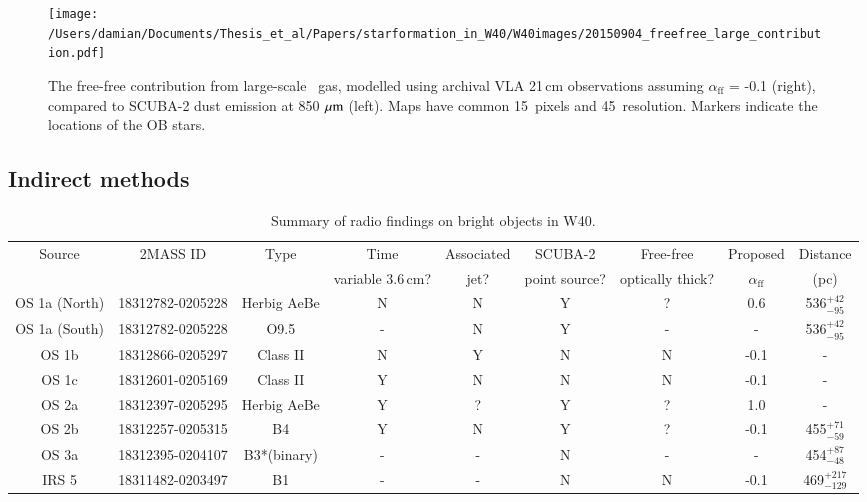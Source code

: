 \begin{figure}
\begin{centering}
\texttt{[image: /Users/damian/Documents/Thesis\_et\_al/Papers/starformation\_in\_W40/W40images/20150904\_freefree\_large\_contribution.pdf]}
\caption{The free-free contribution from large-scale \HII\ gas, modelled using archival VLA 21\,cm observations \citep{Condon:1998kx} assuming $\alpha_{\mathrm{ff}}$ = -0.1 (right), compared to SCUBA-2 dust emission at 850\,$\,\mu\rm{m}$ (left). Maps have common 15\arcsec\ pixels and 45\arcsec\ resolution. Markers indicate the locations of the OB stars.} 
\label{fig:freefree21}
\end{centering}
\end{figure} 



\subsection{Indirect methods}

\begin{table}
\caption{Summary of radio findings on bright objects in W40. }
\begin{center}
\begin{tabular}{|ccccccccc|}
\hline
Source	&	2MASS ID		&	Type		&	Time				&	Associated	&	SCUBA-2 		&	Free-free		&	Proposed				&	Distance  \\
		&				&			&	variable 3.6\,cm?	&	jet?			&	point source?	&	optically thick?	&	$\alpha_{\mathrm{ff}}$		&	(pc)		\\
\hline
\hline
OS 1a (North)	& 18312782-0205228	& 	Herbig AeBe	&	N	&	N	&	Y	&	?	&	0.6	&	536$^{+42}_{-95}$	\\
OS 1a (South)	& 18312782-0205228	&	O9.5			&	-	&	N	&	Y	&	-	&	-	&	536$^{+42}_{-95}$	\\
OS 1b		& 18312866-0205297	&	Class II		&	N	&	Y	&	N	&	N	&	-0.1	&	-				\\
OS 1c		& 18312601-0205169	&	Class II		&	Y	&	N	&	N	&	N	&	-0.1	&	-				\\
OS 2a		& 18312397-0205295	&	Herbig AeBe	&	Y	&	?	&	Y	&	?	&	1.0	&	-				\\
OS 2b		& 18312257-0205315	&	B4			&	Y	&	N	&	Y	&	?	&	-0.1	&	455$^{+71}_{-59}$	\\
OS 3a		& 18312395-0204107	&	B3*(binary)	&	-	&	-	&	N	&	-	&	-	&	454$^{+87}_{-48}$	\\
IRS 5		& 18311482-0203497	&	B1			&	-	&	-	&	N	&	N	&	-0.1	&	469$^{+217}_{-129}$	\\
\hline
\end{tabular}
\end{center}
\label{tab:stars}
\end{table}%

